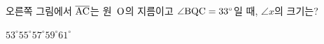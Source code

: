 \noindent\begin{minipage}[t]{0.58\linewidth}\vspace{0pt}\raggedright 오른쪽 그림에서 $\overline{\mathrm{AC}}$는 원~$\mathrm{O}$의 지름이고 $\angle\mathrm{BQC}=33^\circ$일 때, $\angle x$의 크기는?\end{minipage}\hfill\begin{minipage}[t]{0.4\linewidth}\vspace{0pt}\centering \resizebox{\ifdim\width>\linewidth\linewidth\else\width\fi}{!}{}\end{minipage}\par
\begin{choicesii}{$53^\circ$}{$55^\circ$}{$57^\circ$}{$59^\circ$}{$61^\circ$}\end{choicesii}
